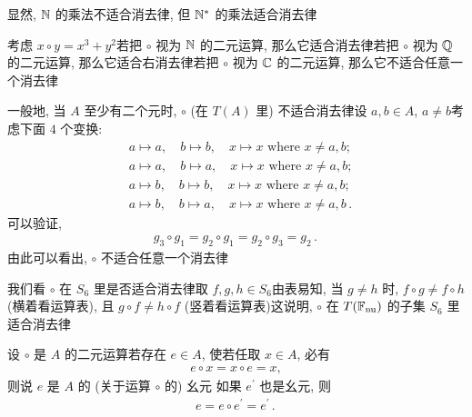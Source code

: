 \begin{example}
    显然, $\mathbb{N}$ 的乘法不适合消去律, 但 $\mathbb{N}^{\ast}$ 的乘法适合消去律\period
\end{example}

\begin{example}
    考虑 $x \circ y = x^3 + y^2$\period 若把 $\circ$ 视为 $\mathbb{N}$ 的二元运算, 那么它适合消去律\period 若把 $\circ$ 视为 $\mathbb{Q}$ 的二元运算, 那么它适合右消去律\period 若把 $\circ$ 视为 $\mathbb{C}$ 的二元运算, 那么它不适合任意一个消去律\period
\end{example}

\begin{example}
    一般地, 当 $A$ 至少有二个元时, $\circ$ (在 $T(A)$ 里) 不适合消去律\period 设 $a,b \in A$, $a \neq b$\period 考虑下面 $4$ 个变换:
    \begin{align*}
         & a \mapsto a, \quad b \mapsto b, \quad x \mapsto x \text{ where $x \neq a,b$}; \tag*{$g_0 \colon$}       \\
         & a \mapsto a, \quad b \mapsto a, \quad x \mapsto x \text{ where $x \neq a,b$}; \tag*{$g_1 \colon$}       \\
         & a \mapsto b, \quad b \mapsto b, \quad x \mapsto x \text{ where $x \neq a,b$}; \tag*{$g_2 \colon$}       \\
         & a \mapsto b, \quad b \mapsto a, \quad x \mapsto x \text{ where $x \neq a,b$}\period \tag*{$g_3 \colon$}
    \end{align*}
    可以验证,
    \begin{align*}
        g_3 \circ g_1 = g_2 \circ g_1 = g_2 \circ g_3 = g_2 \period
    \end{align*}
    由此可以看出, $\circ$ 不适合任意一个消去律\period
\end{example}

\begin{example}
    我们看 $\circ$ 在 $S_6$ 里是否适合消去律\period 取 $f,g,h \in S_6$\period 由表易知, 当 $g \neq h$ 时, $f \circ g \neq f \circ h$ (横着看运算表), 且 $g \circ f \neq h \circ f$ (竖着看运算表)\period 这说明, $\circ$ 在 $T(\mathbb{F}_{\mathrm{nu}})$ 的子集 $S_6$ 里适合消去律\period
\end{example}

\begin{definition}
    设 $\circ$ 是 $A$ 的二元运算\period 若存在 $e \in A$, 使若任取 $x \in A$, 必有
    \begin{align*}
        e \circ x = x \circ e = x,
    \end{align*}
    则说 $e$ 是 $A$ 的 (关于运算 $\circ$ 的) 幺元 \period 如果 $e^{\prime}$ 也是幺元, 则
    \begin{align*}
        e = e \circ e^{\prime} = e^{\prime} \period
    \end{align*}
\end{definition}

